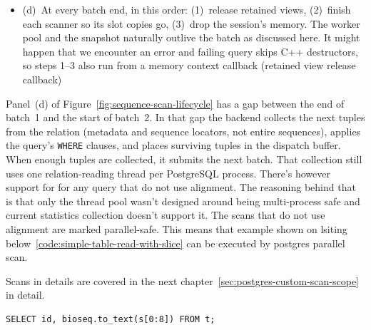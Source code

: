 \begin{itemize}
  Using templated types could be possible here, but they still would need type erasure.
  A retained view additionally holds a release callback (C-style destructor)
  \item (d)~At every batch end, in this order: (1)~release retained views, (2)~finish each scanner so its slot copies go, (3)~drop the session's memory.
  The worker pool and the snapshot naturally outlive the batch as discussed here.
  It might happen that we encounter an error and failing query skips C++ destructors, so steps 1--3 also run from a memory context callback (retained view release callback)
\label{lst:sequence-scan-lifecycle-steps}
\end{itemize}


Panel~(d) of Figure~\ref{fig:sequence-scan-lifecycle} has a gap between the end of batch~1 and the start of batch~2.
In that gap the backend collects the next tuples from the relation (metadata and sequence locators, not entire sequences), applies the query's \texttt{WHERE} clauses, and places surviving tuples in the dispatch buffer.
When enough tuples are collected, it submits the next batch.
That collection still uses one relation-reading thread per PostgreSQL process.
There's however support for  for any query that do not use alignment. 
The reasoning behind that is that only the thread pool wasn't designed around being multi-process safe and current statistics collection doesn't support it.
The scans that do not use alignment are marked parallel-safe. This means that example shown on lsiting below~\ref{code:simple-table-read-with-slice} can be executed by postgres parallel scan.

Scans in details are covered in the next chapter~\ref{sec:postgres-custom-scan-scope} in detail.

\noindent\begin{minipage}{\linewidth}
\begin{lstlisting}[style=bioseq-search-sql,caption={Simple table read},label={code:simple-table-read-with-slice}]
  SELECT id, bioseq.to_text(s[0:8]) FROM t;
\end{lstlisting}
\end{minipage}

